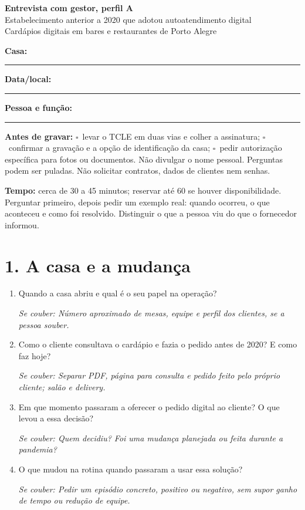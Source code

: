 \documentclass[11pt,a4paper]{article}
\newcommand{\aprofundar}[1]{\par{\small\color{gray}\textit{Se couber: #1}}}
\newcommand{\marcar}{$\square$\ }
\begin{document}
\begin{center}
  {\Large\bfseries Entrevista com gestor, perfil A}\\[0.3em]
  {\small Estabelecimento anterior a 2020 que adotou autoatendimento digital}\\[0.3em]
  Cardápios digitais em bares e restaurantes de Porto Alegre
\end{center}

\textbf{Casa:} \rule{7cm}{0.4pt}\quad
\textbf{Data/local:} \rule{4cm}{0.4pt}

\textbf{Pessoa e função:} \rule{9cm}{0.4pt}

\textbf{Antes de gravar:} \marcar levar o TCLE em duas vias e colher a assinatura; \marcar confirmar a gravação e a opção de identificação da casa; \marcar pedir autorização específica para fotos ou documentos. Não divulgar o nome pessoal. Perguntas podem ser puladas. Não solicitar contratos, dados de clientes nem senhas.

\textbf{Tempo:} cerca de 30 a 45 minutos; reservar até 60 se houver disponibilidade. Perguntar primeiro, depois pedir um exemplo real: quando ocorreu, o que aconteceu e como foi resolvido. Distinguir o que a pessoa viu do que o fornecedor informou.

\section*{1. A casa e a mudança}
\begin{enumerate}
  \item Quando a casa abriu e qual é o seu papel na operação?
    \aprofundar{Número aproximado de mesas, equipe e perfil dos clientes, se a pessoa souber.}
  \item Como o cliente consultava o cardápio e fazia o pedido antes de 2020? E como faz hoje?
    \aprofundar{Separar PDF, página para consulta e pedido feito pelo próprio cliente; salão e delivery.}
  \item Em que momento passaram a oferecer o pedido digital ao cliente? O que levou a essa decisão?
    \aprofundar{Quem decidiu? Foi uma mudança planejada ou feita durante a pandemia?}
  \item O que mudou na rotina quando passaram a usar essa solução?
    \aprofundar{Pedir um episódio concreto, positivo ou negativo, sem supor ganho de tempo ou redução de equipe.}
\end{enumerate}
\end{document}
